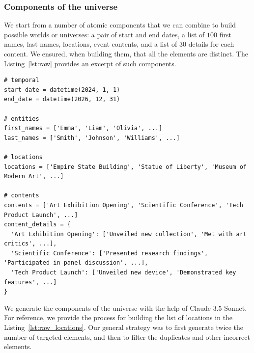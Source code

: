 \documentclass{article}
\begin{document}
\subsubsection{Components of the universe}\label{app:1book:raw_materials}

We start from a number of atomic components that we can combine to build possible worlds or universes: a pair of start and end dates, a list of $100$ first names, last names, locations, event contents, and a list of $30$ details for each content. We ensured, when building them, that all the elements are distinct. The Listing~\ref{lst:raw} provides an excerpt of such components.

\begin{lstlisting}[style=mystyle, caption={Excerpt of the raw materials}, label={lst:raw}]
# temporal
start_date = datetime(2024, 1, 1)
end_date = datetime(2026, 12, 31)

# entities
first_names = ['Emma', 'Liam', 'Olivia', ...]
last_names = ['Smith', 'Johnson', 'Williams', ...]

# locations
locations = ['Empire State Building', 'Statue of Liberty', 'Museum of Modern Art', ...]

# contents
contents = ['Art Exhibition Opening', 'Scientific Conference', 'Tech Product Launch', ...]
content_details = {
  'Art Exhibition Opening': ['Unveiled new collection', 'Met with art critics', ...],
  'Scientific Conference': ['Presented research findings', 'Participated in panel discussion', ...],
  'Tech Product Launch': ['Unveiled new device', 'Demonstrated key features', ...]
}
\end{lstlisting}

We generate the components of the universe with the help of Claude 3.5 Sonnet. For reference, we provide the process for building the list of locations in the Listing~\ref{lst:raw_locations}. Our general strategy was to first generate twice the number of targeted elements, and then to filter the duplicates and other incorrect elements.
\end{document}
